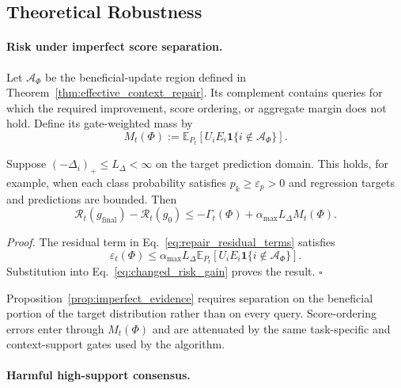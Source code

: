 \subsection{Theoretical Robustness}
\label{app:theoretical-robustness}

\paragraph{Risk under imperfect score separation.}
\label{app:imperfect-separation}

Let $\mathcal A_\Phi$ be the beneficial-update region defined in
Theorem~\ref{thm:effective_context_repair}.  Its complement contains queries
for which the required improvement, score ordering, or aggregate margin
does not hold. Define its gate-weighted mass by
\begin{equation}
M_t(\Phi)
:=\mathbb E_{P_t}\!\left[
U_iE_i\mathbf 1\{i\notin\mathcal A_\Phi\}\right].
\label{eq:misalignment_mass}
\end{equation}

\begin{proposition}
\label{prop:imperfect_evidence}
Suppose $(-\Delta_i)_+\leq L_\Delta<\infty$ on the target prediction domain.
This holds, for example, when each class probability satisfies
$p_k\geq\varepsilon_p>0$ and regression targets and predictions are bounded. Then
\begin{equation}
\mathcal R_t(g_{\mathrm{final}})-\mathcal R_t(g_0)
\leq
-\Gamma_t(\Phi)+\alpha_{\max}L_\Delta M_t(\Phi).
\label{eq:imperfect_evidence_risk}
\end{equation}
\end{proposition}

\noindent\emph{Proof.}
The residual term in Eq.~\eqref{eq:repair_residual_terms} satisfies
\[
\varepsilon_t(\Phi)
\leq\alpha_{\max}L_\Delta
\mathbb E_{P_t}[U_iE_i\mathbf 1\{i\notin\mathcal A_\Phi\}].
\]
Substitution into Eq.~\eqref{eq:changed_risk_gain} proves the result.
\hfill$\square$

Proposition~\ref{prop:imperfect_evidence} requires separation on the
beneficial portion of the target distribution rather than on every query.
Score-ordering errors enter through $M_t(\Phi)$ and are attenuated by the
same task-specific and context-support gates used by the algorithm.

\paragraph{Harmful high-support consensus.}
\label{app:harmful-consensus}

